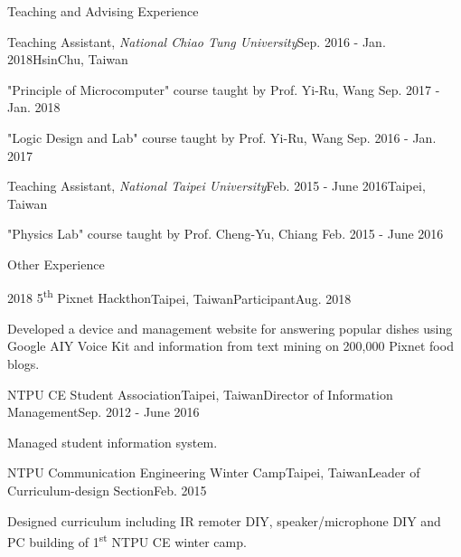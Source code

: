 \documentclass{resume} %
\newcommand{\ts}{\textsuperscript}
\begin{document}
\begin{rSection}{Teaching and Advising Experience}
    \begin{rSubsection}{Teaching Assistant, \it{National Chiao Tung University}}{Sep. 2016 - Jan. 2018}{}{HsinChu, Taiwan}
        \item "Principle of Microcomputer" course taught by Prof. Yi-Ru, Wang \hfill Sep. 2017 - Jan. 2018
        \item "Logic Design and Lab" course taught by Prof. Yi-Ru, Wang \hfill Sep. 2016 - Jan. 2017
    \end{rSubsection}
    \begin{rSubsection}{Teaching Assistant, \it{National Taipei University}}{Feb. 2015 - June 2016}{}{Taipei, Taiwan}
        \item "Physics Lab" course taught by Prof. Cheng-Yu, Chiang \hfill Feb. 2015 - June 2016
    \end{rSubsection}
\end{rSection}

\begin{rSection}{Other Experience}
    \begin{rSubsection}{2018 5\ts{th} Pixnet Hackthon}{Taipei, Taiwan}{Participant}{Aug. 2018}
        \item Developed a device and management website for answering popular dishes using Google AIY Voice Kit and information from text mining on 200,000 Pixnet food blogs.
    \end{rSubsection}
    \begin{rSubsection}{NTPU CE Student Association}{Taipei, Taiwan}{Director of Information Management}{Sep. 2012 - June 2016}
        \item Managed student information system.
    \end{rSubsection}
    \begin{rSubsection}{NTPU Communication Engineering Winter Camp}{Taipei, Taiwan}{Leader of Curriculum-design Section}{Feb. 2015}
        \item Designed curriculum including IR remoter DIY, speaker/microphone DIY and PC building of 1\ts{st} NTPU CE winter camp.
    \end{rSubsection}
\end{rSection}
\end{document}

